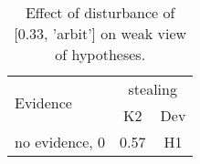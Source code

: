 \begin{table}\begin{tabular}{l|cc}\toprule\multirow{2}{*}{Evidence} & \multicolumn{2}{c}{stealing}\\& {K2} & {Dev}\\\midrule
no evidence, 0 & \cellcolor{Bittersweet}0.57&\cellcolor{Bittersweet}H1\\\bottomrule\end{tabular}\caption{Effect of disturbance of [0.33, 'arbit'] on weak view of hypotheses.}\end{table}